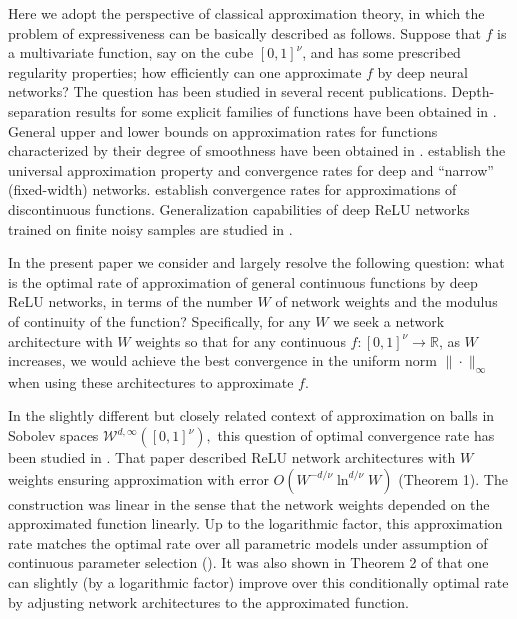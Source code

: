 \documentclass[final, 12pt]{colt2018}
\begin{document}
Here we adopt the perspective of classical approximation theory, in which the problem of expressiveness can be basically described as follows. Suppose that $f$ is a multivariate function, say on the cube $[0,1]^\nu$, and has some prescribed regularity properties; how efficiently can one approximate $f$ by deep neural networks?  The question has been studied in several recent publications. Depth-separation results for some explicit families of functions have been obtained in \cite{safran2016depth, telgarsky2016benefits}. General upper and lower bounds on approximation rates for functions characterized by their degree of smoothness have been obtained in \cite{liang2016why, yarotsky2017nn}. \cite{hanin2017approximating, lu2017expressive} establish the universal approximation property and convergence rates for deep and ``narrow'' (fixed-width) networks. \cite{petersen2017optimal} establish convergence rates for approximations of discontinuous functions. Generalization capabilities of deep ReLU networks trained on finite noisy samples are studied in \cite{schmidthieber2017nonparametric}.

In the present paper we consider and largely resolve the following  question: what is the optimal rate of approximation of general continuous functions by deep ReLU networks, in terms of the number $W$ of network weights and the modulus of continuity of the function? Specifically, for any $W$ we seek a network architecture with $W$ weights so that for any continuous $f:[0,1]^\nu\to \mathbb R$, as $W$ increases, we would achieve the best convergence in the uniform  norm $\|\cdot\|_\infty$ when using these architectures to approximate $f$.

In the slightly different but closely related context of approximation on balls in Sobolev spaces $\mathcal W^{d,\infty}([0,1]^\nu),$ this question of optimal convergence rate has been studied in \cite{yarotsky2017nn}. That paper described ReLU network architectures with $W$ weights ensuring approximation with error $O(W^{-d/\nu}\ln^{d/\nu} W)$ (Theorem 1). The construction was linear in the sense that the network weights depended on the approximated function linearly. Up to the logarithmic factor, this approximation rate matches the optimal rate over all parametric models under assumption of continuous parameter selection (\cite{devore1989optimal}). It was also shown in Theorem 2 of \cite{yarotsky2017nn} that one can slightly (by a logarithmic factor) improve over this conditionally optimal rate by adjusting network architectures to the approximated function.  
\end{document}
